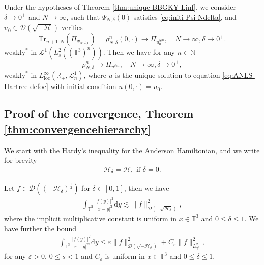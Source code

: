 \begin{cor}
  \label{corollary:main}Under the hypotheses of Theorem
  \ref{thm:unique-BBGKY-Linf}, we consider $\delta \rightarrow 0^+$ and $N
  \rightarrow \infty$, such that $\Psi_{N, \delta}(0)$ satisfies
  \eqref{eq:initi-Psi-Ndelta}, and $u_0 \in \mathcal{D} \left( \sqrt{-
  \mathcal{H}} \right)$ verifies
  \[ 
  \mathrm{Tr}_{n + 1 : N} (\Pi_{\Psi_{N, \delta, 0}}) = \rho_{N, \delta}^n
     (0, \cdot) \rightarrow \Pi_{u^{\otimes n}_0}, \quad
     N \rightarrow \infty, \delta \rightarrow 0^+ .
  \]
  $\mathrm{weakly}^{\ast}$ in $\mathcal{L}^1 (L_s^2
     ((\mathbb{T}^3)^n))$. Then we have for any $n \in \mathbb{N}$
  \[ \rho_{N, \delta}^n \rightarrow \Pi_{u^{\otimes n}}, \quad N \rightarrow \infty, \delta \rightarrow 0^+, \]
  $\mathrm{weakly}^{\ast}$ in $L^{\infty}_{\mathrm{loc}} (\mathbb{R}_+,
     \mathcal{L}^1_n)$, where $u$ is the unique solution to equation \eqref{eq:ANLS-Hartree-defoc}
  with initial condition $u (0, \cdot) = u_0$.
\end{cor}

\subsection{Proof of the convergence, Theorem
\ref{thm:convergencehierarchy}}\label{sec:conv-bbgky-proof}

We start with the Hardy's inequality for the Anderson Hamiltonian, and we write for brevity 
\begin{align}
\mathcal{H }_{\delta} = \mathcal{H}, \text{ if } \delta = 0.
\end{align}

\begin{lem}
  \label{lem:Hardy}Let $f \in \mathcal{D} ((- \mathcal{H}_{\delta})^{\frac{1}{2}})$ for $\delta \in [0, 1]$, then we have
  \begin{align}
    \int_{\mathbb{T}^3} \frac{| f (y) |^2}{| x - y |^2} \mathrm{d}y \lesssim \| f
    \|_{\mathcal{D} (- \sqrt{\mathcal{H}_{\delta}})}^2, \label{eq:hardy-AH}
  \end{align}
  where the implicit multiplicative constant is uniform in $x \in
  \mathbb{T}^3$ and $0 \leqslant \delta \leqslant 1$. We have further the
  bound
  \begin{align}
    \int_{\mathbb{T}^3} \frac{| f (y) |^2}{| x - y |^{2 s}} \mathrm{d} y \leq
    \varepsilon \| f \|_{\mathcal{D} (\sqrt{- \mathcal{H}_{\delta}})}^2 +
    C_{\varepsilon} \| f \|^2_{L_{\mathbb{T}^3}^2}, \label{eq:Hardy-itp}
  \end{align}
  for any $\varepsilon > 0$, $0 \leq s < 1$ and $C_{\varepsilon}$ is uniform
  in $x \in \mathbb{T}^3$ and $0 \leqslant \delta \leqslant 1$.
\end{lem}


